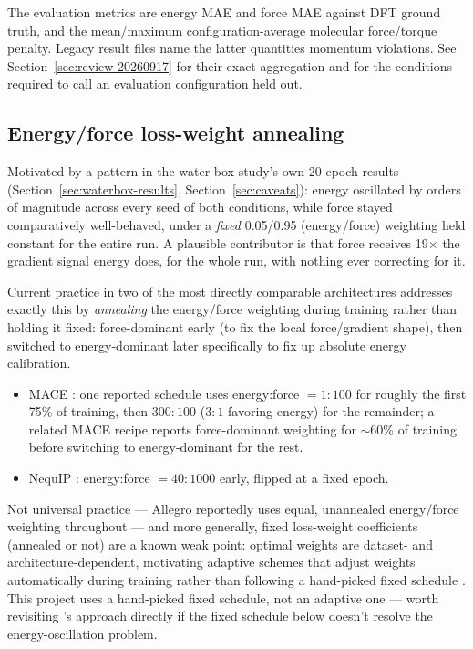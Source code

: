 \documentclass[11pt]{article}
\begin{document}
The evaluation metrics are energy MAE and force MAE against DFT ground
truth, and the mean/maximum configuration-average molecular force/torque
penalty. Legacy result files name the latter quantities momentum violations.
See Section~\ref{sec:review-20260917} for their exact aggregation and for
the conditions required to call an evaluation configuration held out.

\subsection{Energy/force loss-weight annealing}
\label{sec:anneal}

Motivated by a pattern in the water-box study's own 20-epoch results
(Section~\ref{sec:waterbox-results}, Section~\ref{sec:caveats}): energy
oscillated by orders of magnitude across every seed of both conditions,
while force stayed comparatively well-behaved, under a \emph{fixed}
0.05/0.95 (energy/force) weighting held constant for the entire run. A
plausible contributor is that force receives 19$\times$ the gradient signal
energy does, for the whole run, with nothing ever correcting for it.

Current practice in two of the most directly comparable architectures
addresses exactly this by \emph{annealing} the energy/force weighting during
training rather than holding it fixed: force-dominant early (to fix the
local force/gradient shape), then switched to energy-dominant later
specifically to fix up absolute energy calibration.
\begin{itemize}
  \item MACE \cite{mace}: one reported schedule uses energy:force $=1{:}100$
  for roughly the first 75\% of training, then $300{:}100$ ($3{:}1$
  favoring energy) for the remainder; a related MACE recipe reports
  force-dominant weighting for $\sim$60\% of training before switching to
  energy-dominant for the rest.
  \item NequIP \cite{nequip}: energy:force $=40{:}1000$ early, flipped at a
  fixed epoch.
\end{itemize}
Not universal practice --- Allegro reportedly uses equal, unannealed
energy/force weighting throughout --- and more generally, fixed
loss-weight coefficients (annealed or not) are a known weak point: optimal
weights are dataset- and architecture-dependent, motivating adaptive
schemes that adjust weights automatically during training rather than
following a hand-picked fixed schedule \cite{adaptive-weighting}. This
project uses a hand-picked fixed schedule, not an adaptive one --- worth
revisiting \citet{adaptive-weighting}'s approach directly if the fixed
schedule below doesn't resolve the energy-oscillation problem.
\end{document}
